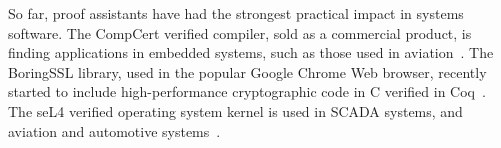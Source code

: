 So far, proof assistants have had the strongest practical impact in systems software.
The CompCert verified compiler, sold as a commercial product, is finding applications in embedded systems, such as those used in aviation~\citep{CompCert-ERTS-2018}. The BoringSSL library, used in the popular Google Chrome Web browser, recently started to include high-performance cryptographic code in C verified in Coq~\citep{Erbsen2019}. The seL4 verified operating system kernel is used in SCADA systems, and aviation and automotive systems~\citep{Klein2018}.

